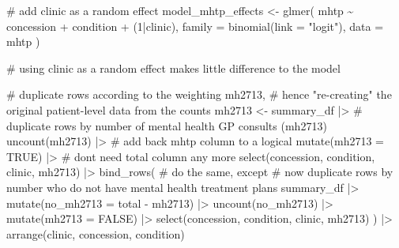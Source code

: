 \documentclass[
  letterpaper,
  DIV=11,
  numbers=noendperiod,
  oneside]{scrartcl}
\newenvironment{Shaded}{\begin{snugshade}}{\end{snugshade}}
\newcommand{\AttributeTok}[1]{\textcolor[rgb]{0.40,0.45,0.13}{#1}}
\newcommand{\CommentTok}[1]{\textcolor[rgb]{0.37,0.37,0.37}{#1}}
\newcommand{\ConstantTok}[1]{\textcolor[rgb]{0.56,0.35,0.01}{#1}}
\newcommand{\DecValTok}[1]{\textcolor[rgb]{0.68,0.00,0.00}{#1}}
\newcommand{\FunctionTok}[1]{\textcolor[rgb]{0.28,0.35,0.67}{#1}}
\newcommand{\NormalTok}[1]{\textcolor[rgb]{0.00,0.23,0.31}{#1}}
\newcommand{\OtherTok}[1]{\textcolor[rgb]{0.00,0.23,0.31}{#1}}
\newcommand{\SpecialCharTok}[1]{\textcolor[rgb]{0.37,0.37,0.37}{#1}}
\newcommand{\StringTok}[1]{\textcolor[rgb]{0.13,0.47,0.30}{#1}}
\begin{document}
\begin{Shaded}
\begin{Highlighting}[]
\CommentTok{\# add clinic as a random effect}
\NormalTok{model\_mhtp\_effects }\OtherTok{\textless{}{-}} \FunctionTok{glmer}\NormalTok{(}
\NormalTok{  mhtp }\SpecialCharTok{\textasciitilde{}}\NormalTok{ concession }\SpecialCharTok{+}\NormalTok{ condition }\SpecialCharTok{+}\NormalTok{ (}\DecValTok{1}\SpecialCharTok{|}\NormalTok{clinic),}
  \AttributeTok{family =} \FunctionTok{binomial}\NormalTok{(}\AttributeTok{link =} \StringTok{"logit"}\NormalTok{),}
  \AttributeTok{data =}\NormalTok{ mhtp}
\NormalTok{)}

\CommentTok{\# using \textquotesingle{}clinic\textquotesingle{} as a random effect makes little difference to the model}
\end{Highlighting}
\end{Shaded}

\begin{Shaded}
\begin{Highlighting}[]
\CommentTok{\# duplicate rows according to the weighting \textquotesingle{}mh2713\textquotesingle{},}
\CommentTok{\# hence "re{-}creating" the original patient{-}level data from the counts}
\NormalTok{mh2713 }\OtherTok{\textless{}{-}}\NormalTok{ summary\_df }\SpecialCharTok{|\textgreater{}}
  \CommentTok{\# duplicate rows by number of mental health GP consults (mh2713)}
  \FunctionTok{uncount}\NormalTok{(mh2713) }\SpecialCharTok{|\textgreater{}}
  \CommentTok{\# add back mhtp column to a logical}
  \FunctionTok{mutate}\NormalTok{(}\AttributeTok{mh2713 =} \ConstantTok{TRUE}\NormalTok{) }\SpecialCharTok{|\textgreater{}} 
  \CommentTok{\# don\textquotesingle{}t need \textquotesingle{}total\textquotesingle{} column any more}
  \FunctionTok{select}\NormalTok{(concession, condition, clinic, mh2713) }\SpecialCharTok{|\textgreater{}}
  \FunctionTok{bind\_rows}\NormalTok{(}
    \CommentTok{\# do the same, except}
    \CommentTok{\# now duplicate rows by number who do not have mental health treatment plans}
\NormalTok{    summary\_df }\SpecialCharTok{|\textgreater{}}
      \FunctionTok{mutate}\NormalTok{(}\AttributeTok{no\_mh2713 =}\NormalTok{ total }\SpecialCharTok{{-}}\NormalTok{ mh2713) }\SpecialCharTok{|\textgreater{}}
      \FunctionTok{uncount}\NormalTok{(no\_mh2713) }\SpecialCharTok{|\textgreater{}}
      \FunctionTok{mutate}\NormalTok{(}\AttributeTok{mh2713 =} \ConstantTok{FALSE}\NormalTok{) }\SpecialCharTok{|\textgreater{}}
      \FunctionTok{select}\NormalTok{(concession, condition, clinic, mh2713)}
\NormalTok{  ) }\SpecialCharTok{|\textgreater{}}
  \FunctionTok{arrange}\NormalTok{(clinic, concession, condition)}


\end{Highlighting}
\end{Shaded}
\end{document}
